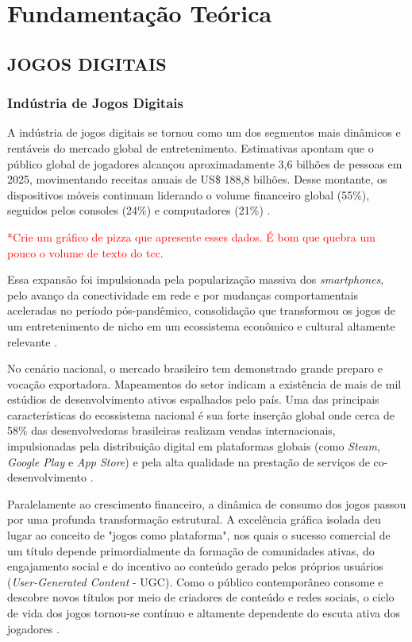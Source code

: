 \chapter{Fundamentação Teórica} \label{cha:fundamentacao}

\section{JOGOS DIGITAIS}

\subsection{Indústria de Jogos Digitais}

A indústria de jogos digitais se tornou como um dos segmentos mais dinâmicos e rentáveis do mercado global de entretenimento. Estimativas apontam que o público global de jogadores alcançou aproximadamente 3,6 bilhões de pessoas em 2025, movimentando receitas anuais de US\$ 188,8 bilhões. Desse montante, os dispositivos móveis continuam liderando o volume financeiro global (55\%), seguidos pelos consoles (24\%) e computadores (21\%) \cite{newzoo2025}. 

\textcolor{red}{*Crie um gráfico de pizza que apresente esses dados. É bom que quebra um pouco o volume de texto do tcc.}

Essa expansão foi impulsionada pela popularização massiva dos \textit{smartphones}, pelo avanço da conectividade em rede e por mudanças comportamentais aceleradas no período pós-pandêmico, consolidação que transformou os jogos de um entretenimento de nicho em um ecossistema econômico e cultural altamente relevante \cite{mbakirtzis2023}. 

No cenário nacional, o mercado brasileiro tem demonstrado grande preparo e vocação exportadora. Mapeamentos do setor indicam a existência de mais de mil estúdios de desenvolvimento ativos espalhados pelo país. Uma das principais características do ecossistema nacional é sua forte inserção global onde cerca de 58\% das desenvolvedoras brasileiras realizam vendas internacionais, impulsionadas pela distribuição digital em plataformas globais (como \textit{Steam}, \textit{Google Play} e \textit{App Store}) e pela alta qualidade na prestação de serviços de co-desenvolvimento \cite{abragames2023}. 

Paralelamente ao crescimento financeiro, a dinâmica de consumo dos jogos passou por uma profunda transformação estrutural. A excelência gráfica isolada deu lugar ao conceito de "jogos como plataforma", nos quais o sucesso comercial de um título depende primordialmente da formação de comunidades ativas, do engajamento social e do incentivo ao conteúdo gerado pelos próprios usuários (\textit{User-Generated Content} - UGC). Como o público contemporâneo consome e descobre novos títulos por meio de criadores de conteúdo e redes sociais, o ciclo de vida dos jogos tornou-se contínuo e altamente dependente do escuta ativa dos jogadores \cite{bain2025}. 


